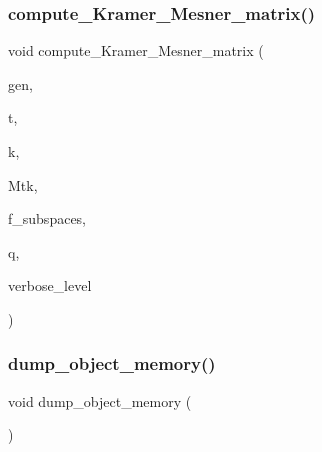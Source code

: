 \subsubsection{\texorpdfstring{compute\+\_\+\+Kramer\+\_\+\+Mesner\+\_\+matrix()}{compute\_Kramer\_Mesner\_matrix()}}
{\footnotesize\ttfamily void compute\+\_\+\+Kramer\+\_\+\+Mesner\+\_\+matrix (\begin{DoxyParamCaption}\item[{\mbox{\hyperlink{classgenerator}{generator}} $\ast$}]{gen,  }\item[{\mbox{\hyperlink{galois_8h_a09fddde158a3a20bd2dcadb609de11dc}{I\+NT}}}]{t,  }\item[{\mbox{\hyperlink{galois_8h_a09fddde158a3a20bd2dcadb609de11dc}{I\+NT}}}]{k,  }\item[{\mbox{\hyperlink{classmatrix}{matrix}} \&}]{Mtk,  }\item[{\mbox{\hyperlink{galois_8h_a09fddde158a3a20bd2dcadb609de11dc}{I\+NT}}}]{f\+\_\+subspaces,  }\item[{\mbox{\hyperlink{galois_8h_a09fddde158a3a20bd2dcadb609de11dc}{I\+NT}}}]{q,  }\item[{\mbox{\hyperlink{galois_8h_a09fddde158a3a20bd2dcadb609de11dc}{I\+NT}}}]{verbose\+\_\+level }\end{DoxyParamCaption})}

\mbox{\label{discreta__global_8_c_a33f2d3fe7d16dd3b0ba4c484bd1e267d}} 
\subsubsection{\texorpdfstring{dump\+\_\+object\+\_\+memory()}{dump\_object\_memory()}}
{\footnotesize\ttfamily void dump\+\_\+object\+\_\+memory (\begin{DoxyParamCaption}{ }\end{DoxyParamCaption})}

\mbox{\label{discreta__global_8_c_a6bd9eb050090f8cf1e92db88a459cc28}} 
